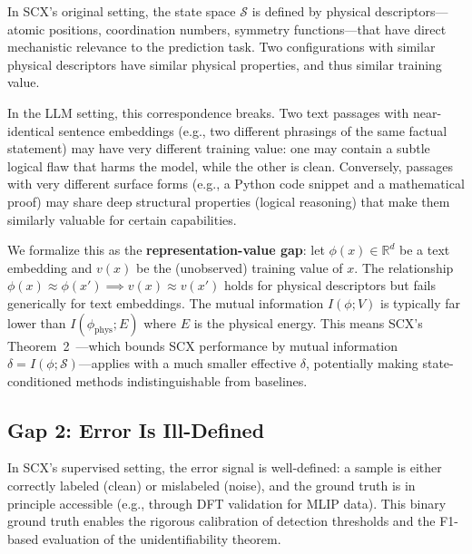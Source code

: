 \documentclass[11pt,twocolumn]{article}
\newcommand{\R}{\mathbb{R}}
\begin{document}
In SCX's original setting, the state space $\mathcal{S}$ is defined by physical descriptors---atomic positions, coordination numbers, symmetry functions---that have direct mechanistic relevance to the prediction task. Two configurations with similar physical descriptors have similar physical properties, and thus similar training value.

In the LLM setting, this correspondence breaks. Two text passages with near-identical sentence embeddings (e.g., two different phrasings of the same factual statement) may have very different training value: one may contain a subtle logical flaw that harms the model, while the other is clean. Conversely, passages with very different surface forms (e.g., a Python code snippet and a mathematical proof) may share deep structural properties (logical reasoning) that make them similarly valuable for certain capabilities.

We formalize this as the \textbf{representation-value gap}: let $\phi(x) \in \R^d$ be a text embedding and $v(x)$ be the (unobserved) training value of $x$. The relationship $\phi(x) \approx \phi(x') \implies v(x) \approx v(x')$ holds for physical descriptors but fails generically for text embeddings. The mutual information $I(\phi; V)$ is typically far lower than $I(\phi_{\text{phys}}; E)$ where $E$ is the physical energy. This means SCX's Theorem~2~\cite{scx2026}---which bounds SCX performance by mutual information $\delta = I(\phi; \mathcal{S})$---applies with a much smaller effective $\delta$, potentially making state-conditioned methods indistinguishable from baselines.

\subsection{Gap 2: Error Is Ill-Defined}

In SCX's supervised setting, the error signal is well-defined: a sample is either correctly labeled (clean) or mislabeled (noise), and the ground truth is in principle accessible (e.g., through DFT validation for MLIP data). This binary ground truth enables the rigorous calibration of detection thresholds and the F1-based evaluation of the unidentifiability theorem.
\end{document}
